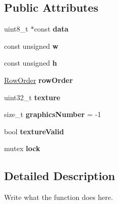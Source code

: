 \subsection*{Public Attributes}
\begin{DoxyCompactItemize}
\item 
\hypertarget{structImage_1_1data__t_ac67fc276ee2d36b128b55765d3c17e34}{uint8\+\_\+t $\ast$const {\bfseries data}}\label{structImage_1_1data__t_ac67fc276ee2d36b128b55765d3c17e34}

\item 
\hypertarget{structImage_1_1data__t_a96f2d68563d824c50271ec4bd9678a90}{const unsigned {\bfseries w}}\label{structImage_1_1data__t_a96f2d68563d824c50271ec4bd9678a90}

\item 
\hypertarget{structImage_1_1data__t_af65617c507d10138bd17ab0f2b168c18}{const unsigned {\bfseries h}}\label{structImage_1_1data__t_af65617c507d10138bd17ab0f2b168c18}

\item 
\hypertarget{structImage_1_1data__t_a421352aef192cbfbe3573553602b308d}{\hyperlink{classImage_a856d0983e089ff127d0bcad3828c1aab}{Row\+Order} {\bfseries row\+Order}}\label{structImage_1_1data__t_a421352aef192cbfbe3573553602b308d}

\item 
\hypertarget{structImage_1_1data__t_a18bba5bf2463c72c13fd56ec736259e9}{uint32\+\_\+t {\bfseries texture}}\label{structImage_1_1data__t_a18bba5bf2463c72c13fd56ec736259e9}

\item 
\hypertarget{structImage_1_1data__t_ae36abf1f11268ef7fe59687c73aca3cf}{size\+\_\+t {\bfseries graphics\+Number} = -\/1}\label{structImage_1_1data__t_ae36abf1f11268ef7fe59687c73aca3cf}

\item 
\hypertarget{structImage_1_1data__t_a149c957f170d9885b4b7245d10f93f3b}{bool {\bfseries texture\+Valid}}\label{structImage_1_1data__t_a149c957f170d9885b4b7245d10f93f3b}

\item 
\hypertarget{structImage_1_1data__t_af8a117a1f656faa849809e187720e969}{mutex {\bfseries lock}}\label{structImage_1_1data__t_af8a117a1f656faa849809e187720e969}

\end{DoxyCompactItemize}


\subsection{Detailed Description}
Write what the function does here. 

